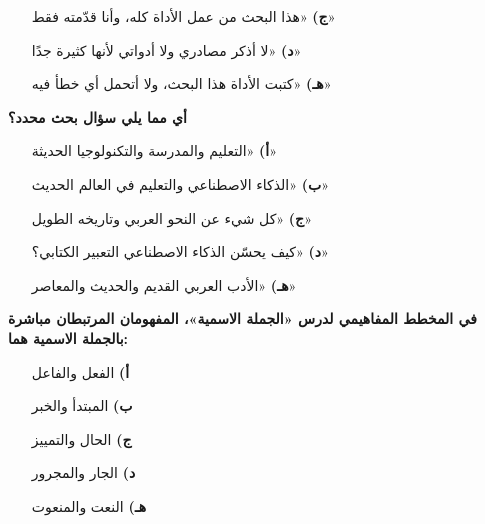 \documentclass[11pt,a4paper]{article}
\begin{document}
\begin{multicols}{2}
\begin{minipage}{\linewidth}
\begin{itemize}[leftmargin=0.95cm, labelsep=4pt, itemsep=0pt, topsep=2pt, parsep=0pt]
  \item[\textbf{ج)}] «هذا البحث من عمل الأداة كله، وأنا قدّمته فقط»
  \item[\textbf{د)}] «لا أذكر مصادري ولا أدواتي لأنها كثيرة جدًا»
  \item[\textbf{هـ)}] «كتبت الأداة هذا البحث، ولا أتحمل أي خطأ فيه»
\end{itemize}
\end{minipage}\par\vspace{7pt plus 4pt}
\noindent\begin{minipage}{\linewidth}
\hangindent=0.7cm\textbf{أي مما يلي سؤال بحث محدد؟}
\begin{itemize}[leftmargin=0.95cm, labelsep=4pt, itemsep=0pt, topsep=2pt, parsep=0pt]
  \item[\textbf{أ)}] «التعليم والمدرسة والتكنولوجيا الحديثة»
  \item[\textbf{ب)}] «الذكاء الاصطناعي والتعليم في العالم الحديث»
  \item[\textbf{ج)}] «كل شيء عن النحو العربي وتاريخه الطويل»
  \item[\textbf{د)}] «كيف يحسّن الذكاء الاصطناعي التعبير الكتابي؟»
  \item[\textbf{هـ)}] «الأدب العربي القديم والحديث والمعاصر»
\end{itemize}
\end{minipage}\par\vspace{7pt plus 4pt}
\noindent\begin{minipage}{\linewidth}
\hangindent=0.7cm\textbf{في المخطط المفاهيمي لدرس «الجملة الاسمية»، المفهومان المرتبطان مباشرة بالجملة الاسمية هما:}
\begin{itemize}[leftmargin=0.95cm, labelsep=4pt, itemsep=0pt, topsep=2pt, parsep=0pt]
  \item[\textbf{أ)}] الفعل والفاعل
  \item[\textbf{ب)}] المبتدأ والخبر
  \item[\textbf{ج)}] الحال والتمييز
  \item[\textbf{د)}] الجار والمجرور
  \item[\textbf{هـ)}] النعت والمنعوت
\end{itemize}
\end{minipage}\par\vspace{7pt plus 4pt}
\noindent\begin{minipage}{\linewidth}

\end{minipage}
\end{multicols}
\end{document}
